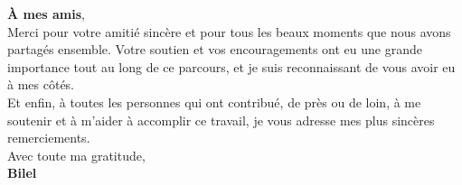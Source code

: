 \begin{center}
\begin{minipage}{0.85\textwidth}
    \textbf{À mes amis},\\

    Merci pour votre amitié sincère et pour tous les beaux moments que nous avons partagés ensemble. Votre soutien et vos encouragements ont eu une grande importance tout au long de ce parcours, et je suis reconnaissant de vous avoir eu à mes côtés.\\

    Et enfin, à toutes les personnes qui ont contribué, de près ou de loin, à me soutenir et à m’aider à accomplir ce travail, je vous adresse mes plus sincères remerciements.\\[12pt]

    Avec toute ma gratitude,\\
    \textbf{Bilel}

  \end{minipage}
\end{center}

\vspace*{\fill}
\newpage
